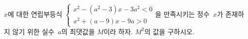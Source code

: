 $x$에 대한 연립부등식 $\begin{cases} x^2-(a^2-3)x-3a^2<0 \\ x^2+(a-9)x-9a>0 \end{cases}$을 만족시키는 정수~$x$가 존재하지 않기 위한 실수~$a$의 최댓값을 $M$이라 하자. $M^2$의 값을 구하시오. 
